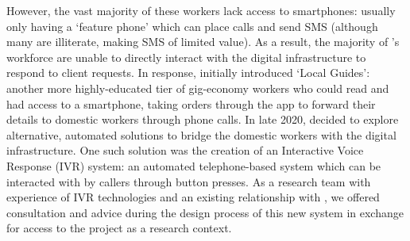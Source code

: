 However, the vast majority of these workers lack access to smartphones: usually only having a `feature phone' which can place calls and send SMS (although many are illiterate, making SMS of limited value). As a result, the majority of \PC{}'s workforce are unable to directly interact with the digital infrastructure to respond to client requests. In response, \PC{} initially introduced `Local Guides': another more highly-educated tier of gig-economy workers who could read and had access to a smartphone, taking orders through the app to forward their details to domestic workers through phone calls. In late 2020, \PC{} decided to explore alternative, automated solutions to bridge the domestic workers with the digital infrastructure. One such solution was the creation of an Interactive Voice Response (IVR) system: an automated telephone-based system which can be interacted with by callers through button presses. As a research team with experience of IVR technologies and an existing relationship with \NGO{}, we offered consultation and advice during the design process of this new system in exchange for access to the project as a research context.